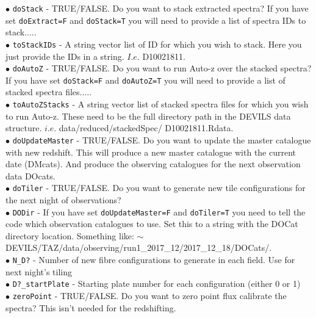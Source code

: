 \documentclass[12pt]{article}
\begin{document}
$\bullet$ \texttt{doStack} - TRUE/FALSE. Do you want to stack extracted spectra? If you have set \texttt{doExtract=F} and \texttt{doStack=T} you will need to provide a list of spectra IDs to stack..... \\

$\bullet$ \texttt{toStackIDs} - A string vector list of ID for which you wish to stack. Here you just provide the IDs in a string. $I.e.$ D10021811.\\

$\bullet$ \texttt{doAutoZ} - TRUE/FALSE. Do you want to run Auto-z over the stacked spectra? If you have set \texttt{doStack=F} and \texttt{doAutoZ=T} you will need to provide a list of stacked spectra files..... \\

$\bullet$ \texttt{toAutoZStacks} - A string vector list of stacked spectra files for which you wish to run Auto-z. These need to be the full directory path in the DEVILS data structure. $i.e.$ data/reduced/stackedSpec/ D10021811.Rdata. \\

$\bullet$ \texttt{doUpdateMaster} - TRUE/FALSE. Do you want to update the master catalogue with new redshift. This will produce a new master catalogue with the current date (DMcats). And produce the observing catalogues for the next observation data DOcats. \\ 

$\bullet$ \texttt{doTiler} -  TRUE/FALSE. Do you want to generate new tile configurations for the next night of observations? \\

$\bullet$ \texttt{DODir} - If you have set \texttt{doUpdateMaster=F} and \texttt{doTiler=T} you need to tell the code which observation catalogues to use. Set this to a string with the DOCat directory location. Something like: $\sim$DEVILS/TAZ/data/observing/run1\_2017\_12/2017\_12\_18/DOCats/.\\

$\bullet$ \texttt{N\_D?} - Number of new fibre configurations to generate in each field. Use for next night's tiling\\

$\bullet$ \texttt{D?\_startPlate} - Starting plate number for each configuration (either 0 or 1)\\

$\bullet$ \texttt{zeroPoint} -  TRUE/FALSE. Do you want to zero point flux calibrate the spectra? This isn't needed for the redshifting. \\
\end{document}
